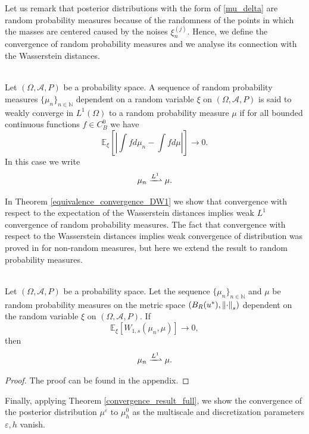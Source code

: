 \documentclass[10pt]{article}
\begin{document}
Let us remark that posterior distributions with the form of \eqref{mu_delta} are random probability measures because of the randomness of the points in which the masses are centered caused by the noises $\xi_{n}^{(j)}$. Hence, we define the convergence of random probability measures and we analyse its connection with the Wasserstein distances.

\begin{definition}
\label{weak_convergence_L1_distribution}
\leavevmode \\
Let $(\Omega, \mathcal{A}, P)$ be a probability space. A sequence of random probability measures $\{ \mu_n \}_{n \in \mathbb{N}}$ dependent on a random variable $\xi$ on $(\Omega, \mathcal{A}, P)$ is said to weakly converge in $L^1(\Omega)$ to a random probability measure $\mu$ if for all bounded continuous functions $f \in C^0_B$ we have
\[ \mathbb{E}_{\xi} \left [ \left |\int f d \mu_n - \int f d \mu  \right | \right ] \to 0. \]
In this case we write
\[ \mu_n \xrightharpoonup{L^1} \mu. \]
\end{definition}

In Theorem \ref{equivalence_convergence_DW1} we show that convergence with respect to the expectation of the Wasserstein distances implies weak $L^1$ convergence of random probability measures. The fact that convergence with respect to the Wasserstein distances implies weak convergence of distribution was proved in \cite{San15} for non-random measures, but here we extend the result to random probability measures.

\begin{theorem}
\label{equivalence_convergence_DW1}
\leavevmode \\
Let $(\Omega, \mathcal{A}, P)$ be a probability space. Let the sequence $\{ \mu_n \}_{n \in \mathbb{N}}$ and $\mu$ be random probability measures on the metric space $(B_R(u^*), \left\|\cdot\right\|_s)$ dependent on the random variable $\xi$ on $(\Omega, \mathcal{A}, P)$. If
\[ \mathbb{E}_{\xi} [W_{1,s}(\mu_n, \mu)] \to 0, \]
then
\[ \mu_n \xrightharpoonup{L^1} \mu. \]
\end{theorem}
\begin{proof}
The proof can be found in the appendix.
\end{proof}

Finally, applying Theorem \ref{convergence_result_full}, we show the convergence of the posterior distribution $\mu^{\varepsilon}$ to $\mu_h^0$ as the multiscale and discretization parameters $\varepsilon, h$ vanish.
\end{document}
